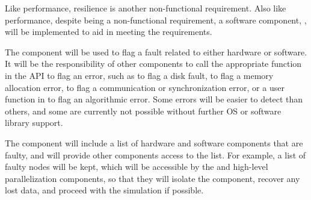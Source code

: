 \documentclass[10pt,twocolumn]{article}
\begin{document}
Like performance, resilience is another non-functional requirement.
Also like performance, despite being a non-functional requirement, a
software component, , will be implemented to aid in
meeting the requirements.

The  component will be used to flag a fault related to
either hardware or software.  It will be the responsibility of other
components to call the appropriate function in the  API to
flag an error, such as  to flag a disk fault, 
to flag a memory allocation error,  to flag a
communication or synchronization error, or a user function in
 to flag an algorithmic error.  Some errors will be
easier to detect than others, and some are currently not possible
without further OS or software library support.

The  component will include a list of hardware and software
components that are faulty, and will provide other components access to
the list.  For example, a list of faulty nodes will be kept, which will
be accessible by the  and high-level parallelization components,
so that they will isolate the component, recover any lost data, and proceed
with the simulation if possible.

% 
% 
\end{document}
